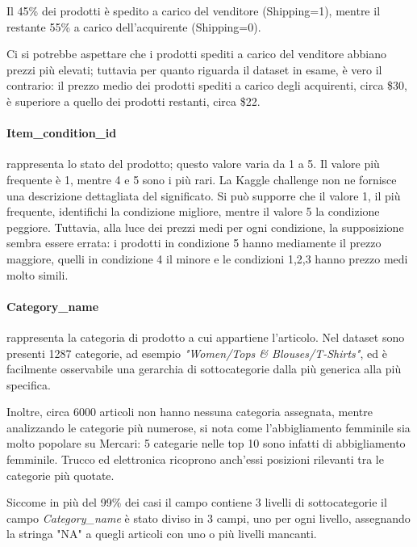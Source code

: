 Il 45\% dei prodotti è spedito a carico del venditore (Shipping=1), mentre il
restante 55\% a carico dell'acquirente (Shipping=0).

Ci si potrebbe aspettare che i prodotti spediti a carico del venditore abbiano
prezzi più elevati; tuttavia  per quanto riguarda il dataset in
esame, è vero il contrario: il prezzo medio dei prodotti spediti a carico degli
acquirenti, circa \$30, è superiore a quello dei prodotti restanti,
circa \$22.


\paragraph{Item\_condition\_id} rappresenta lo stato del prodotto; questo valore
varia da 1 a 5. Il valore più frequente è 1, mentre 4 e 5 sono i più rari. La
Kaggle challenge non ne fornisce una descrizione dettagliata del significato. Si
può supporre che il valore 1, il più frequente, identifichi la condizione
migliore, mentre il valore 5 la condizione peggiore. Tuttavia, alla luce dei
prezzi medi per ogni condizione, la supposizione sembra essere errata: i
prodotti in condizione 5 hanno mediamente il prezzo maggiore, quelli in
condizione 4 il minore e le condizioni 1,2,3 hanno prezzo medi molto simili.

\paragraph{Category\_name} rappresenta la categoria di prodotto a cui appartiene l'articolo. Nel dataset
sono presenti 1287 categorie, ad esempio \textit{"Women/Tops \&
Blouses/T-Shirts"}, ed è facilmente osservabile una gerarchia di
sottocategorie dalla più generica alla più specifica.

Inoltre, circa 6000 articoli non hanno nessuna categoria assegnata, mentre
analizzando le categorie più numerose, si nota come l'abbigliamento
femminile sia molto popolare su Mercari: 5 categarie nelle top 10 sono infatti
di abbigliamento femminile. Trucco ed elettronica ricoprono anch'essi posizioni
rilevanti tra le categorie più quotate.

Siccome in più del 99\% dei casi il campo contiene 3 livelli di sottocategorie
il campo \textit{Category\_name} è stato diviso in 3 campi, uno per ogni livello,
assegnando la stringa "NA" a quegli articoli con uno o più livelli mancanti.

